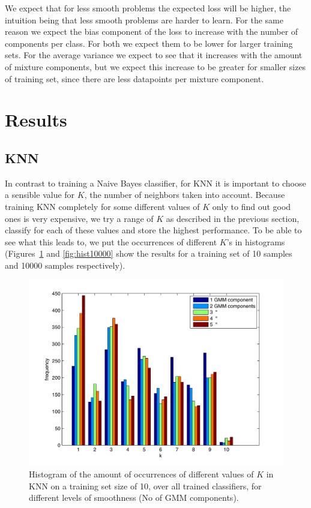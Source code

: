 \documentclass[a4paper]{article}
\begin{document}
We expect that for less smooth problems the expected loss will be higher, the intuition being that less smooth problems are harder to learn. For the same reason we expect the bias component of the loss to increase with the number of components per class. For both we expect them to be lower for larger training sets. For the average variance we expect to see that it increases with the amount of mixture components, but we expect this increase to be greater for smaller sizes of training set, since there are less datapoints per mixture component.

\section{Results}
\label{sec:results}

\subsection{KNN}
In contrast to training a Naive Bayes classifier, for KNN it is important to choose a sensible value for $K$, the number of neighbors taken into account. Because training KNN completely for some different values of $K$ only to find out good ones is very expensive, we try a range of $K$ as described in the previous section, classify for each of these values and store the highest performance. To be able to see what this leads to, we put the occurrences of different $K$'s in histograms (Figures~\ref{fig:hist10} and \ref{fig:hist10000} show the results for a training set of 10 samples and 10000 samples respectively).

\begin{figure}[htb]
    \centering
    \includegraphics[width=.9\textwidth]{Hist10.pdf}
    \caption{Histogram of the amount of occurrences of different values of $K$ in KNN on a training set size of 10, over all trained classifiers, for different levels of smoothness (No of GMM components). \label{fig:hist10}}
\end{figure}
\end{document}
